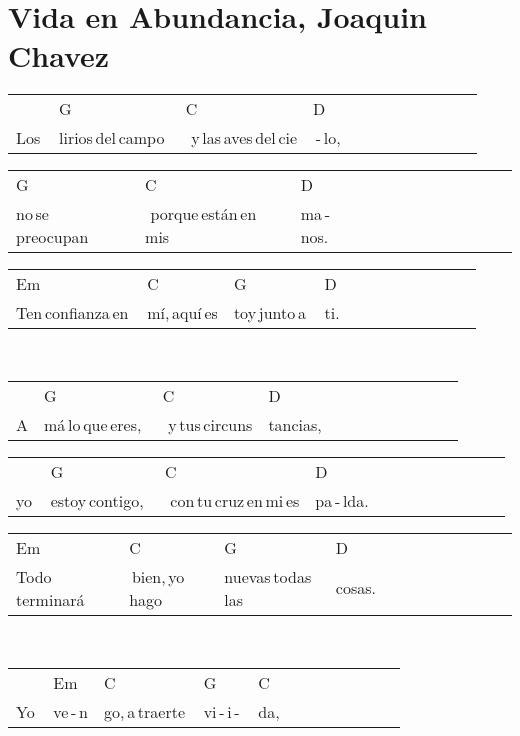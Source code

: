\section*{Vida en Abundancia, Joaquin Chavez\hfill}
\begin{multicols}{2}
\noindent
\begin{minipage}{\columnwidth}
\noindent
\noindent
\begin{tabular}{llllllllllll}
&G&C&D\\
Los\,&lirios\,del\,campo\,\,&\,\,y\,las\,aves\,del\,cie&\,-\,lo,
\end{tabular}

\noindent
\begin{tabular}{llllllllllll}
G&C&D\\
no\,se\,preocupan\,\,&\,\,porque\,están\,en\,mis\,&ma\,-\,nos.
\end{tabular}

\noindent
\begin{tabular}{llllllllllll}
Em&C&G&D\\
Ten\,confianza\,en\,&mí,\,aquí\,es&toy\,junto\,a\,&ti.
\end{tabular}
\end{minipage}\\

\noindent
\begin{minipage}{\columnwidth}
\noindent
\noindent
\begin{tabular}{llllllllllll}
&G&C&D\\
A&má\,lo\,que\,eres,\,\,&\,\,y\,tus\,circuns&tancias,
\end{tabular}

\noindent
\begin{tabular}{llllllllllll}
&G&C&D\\
yo\,&estoy\,contigo,\,\,&\,\,con\,tu\,cruz\,en\,mi\,es&pa\,-\,lda.
\end{tabular}

\noindent
\begin{tabular}{llllllllllll}
Em&C&G&D\\
Todo\,terminará&\,bien,\,yo\,hago\,&nuevas\,todas\,las\,&cosas.
\end{tabular}
\end{minipage}\\

\noindent
\begin{minipage}{\columnwidth}
\noindent
\noindent
\begin{tabular}{llllllllllll}
&Em&C&G&C\\
Yo\,&ve\,-\,n&go,\,a\,traerte\,&vi\,-\,i\,-\,&da,
\end{tabular}


\end{minipage}
\end{multicols}
